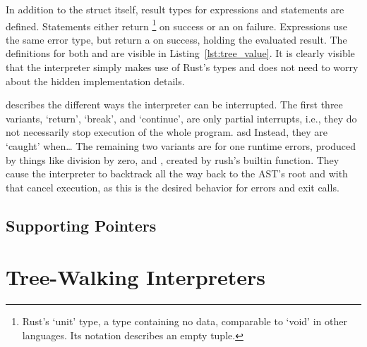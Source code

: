     In addition to the struct itself, result types for expressions and statements are defined.
    Statements either return \qVerb{()}\footnote{Rust's `unit' type, a type containing no data, comparable to `void' in other languages. Its notation describes an empty tuple.} on success or an  on failure.
    Expressions use the same error type, but return a  on success, holding the evaluated result.
    The definitions for both  and  are visible in Listing~\ref{lst:tree_value}.
    It is clearly visible that the interpreter simply makes use of Rust's types and does not need to worry about the hidden implementation details.


     describes the different ways the interpreter can be interrupted.
    The first three variants, `return', `break', and `continue', are only partial interrupts, i.e., they do not necessarily stop execution of the whole program.
    asd
    Instead, they are `caught' when\ldots
    The remaining two variants are for one runtime errors, produced by things like division by zero, and , created by rush's builtin  function.
    They cause the interpreter to backtrack all the way back to the AST's root and with that cancel execution, as this is the desired behavior for errors and exit calls.

    \subsection{Supporting Pointers}\label{sec:tree_pointers}

    \section{Tree-Walking Interpreters}

